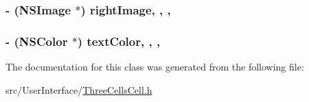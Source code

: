 \hypertarget{interface_three_cells_cell_a1d11e11238587ad7933fb473fbe87d11}{
\subsubsection[{right\-Image}]{\setlength{\rightskip}{0pt plus 5cm}-\/ (N\-S\-Image $\ast$) right\-Image\hspace{0.3cm}{\ttfamily [read]}, {\ttfamily [write]}, {\ttfamily [atomic]}, {\ttfamily [retain]}}}\label{interface_three_cells_cell_a1d11e11238587ad7933fb473fbe87d11}
\hypertarget{interface_three_cells_cell_ac8dfc097540a36e87adbec356c355a7c}{
\subsubsection[{text\-Color}]{\setlength{\rightskip}{0pt plus 5cm}-\/ (N\-S\-Color $\ast$) text\-Color\hspace{0.3cm}{\ttfamily [read]}, {\ttfamily [write]}, {\ttfamily [atomic]}, {\ttfamily [retain]}}}\label{interface_three_cells_cell_ac8dfc097540a36e87adbec356c355a7c}


The documentation for this class was generated from the following file\-:\begin{DoxyCompactItemize}
\item 
src/\-User\-Interface/\hyperlink{_three_cells_cell_8h}{Three\-Cells\-Cell.\-h}\end{DoxyCompactItemize}
